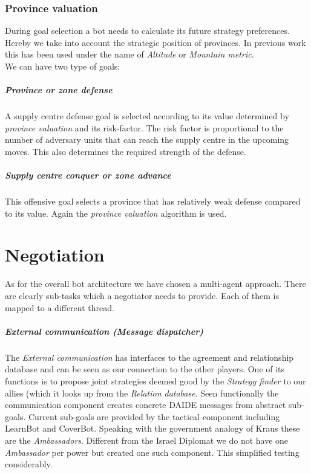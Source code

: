\documentclass[pdftex,11pt,a4paper]{report}
\begin{document}
\subsection{Province valuation}
During goal selection a bot needs to calculate its future strategy
preferences. Hereby we take into account the strategic position of 
provinces. In previous work this has been used under the name
of \textit{Altitude} or \textit{Mountain metric}. \\

We can have two type of goals:

\paragraph{Province or zone defense}
A supply centre defense goal is selected according to its value
determined by \textit{province valuation} and its risk-factor. The
risk factor is proportional to the number of adversary units that 
can reach the supply centre in the upcoming moves. This also determines
the required strength of the defense.

\paragraph{Supply centre conquer or zone advance}
This offensive goal selects a province that has relatively weak 
defense compared to its value. Again the \textit{province valuation}
algorithm is used.


\chapter{Negotiation}

As for the overall bot architecture we have chosen a multi-agent 
approach. There are clearly sub-tasks which a negotiator needs to
provide. Each of them is mapped to a different thread.

\paragraph{External communication (Message dispatcher)}
The \textit{External communication} has interfaces to the agreement 
and relationship database and can be seen as our connection to the
other players. One of its functions is to propose
joint strategies deemed good by the \textit{Strategy finder} to our 
allies (which it looks up from the \textit{Relation database}. Seen
functionally the communication component creates concrete DAIDE
messages from abstract sub-goals. Current sub-goals are provided
by the tactical component including LearnBot and CoverBot. Speaking
with the government analogy of Kraus \cite{Kraus89} these are the
\textit{Ambassadors}. Different from the Israel Diplomat we do not
have one \textit{Ambassador} per power but created one such 
component. This simplified testing considerably. 
\end{document}
